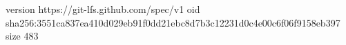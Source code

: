 version https://git-lfs.github.com/spec/v1
oid sha256:3551ca837ea410d029eb91f0dd21ebc8d7b3c12231d0c4e00c6f06f9158eb397
size 483
